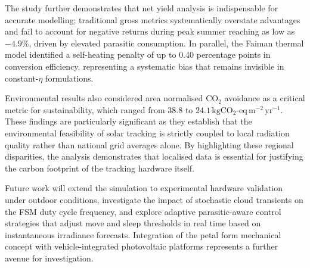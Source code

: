 \documentclass[preprint,3p,12pt]{elsarticle}
\begin{document}
The study further demonstrates that net yield analysis is
indispensable for accurate modelling; traditional gross metrics
systematically overstate advantages and fail to account for negative
returns during peak summer reaching as low as $-4.9\%$, driven by
elevated parasitic consumption. In parallel, the Faiman thermal model
identified a self-heating penalty of up to $0.40$ percentage points
in conversion efficiency, representing a systematic bias that remains
invisible in constant-$\eta$ formulations.

Environmental results also considered area normalised CO$_2$
avoidance as a critical metric for sustainability, which ranged from
$38.8$ to $24.1\,\mathrm{kgCO_2\text{-}eq\,m^{-2}\,yr^{-1}}$.
These findings are particularly significant as they establish that
the environmental feasibility of solar tracking is strictly coupled
to local radiation quality rather than national grid averages alone.
By highlighting these regional disparities, the analysis demonstrates
that localised data is essential for justifying the carbon footprint
of the tracking hardware itself.

Future work will extend the simulation to experimental hardware
validation under outdoor conditions, investigate the impact of
stochastic cloud transients on the FSM duty cycle frequency, and
explore adaptive parasitic-aware control strategies that adjust
move and sleep thresholds in real time based on instantaneous
irradiance forecasts. Integration of the petal form mechanical
concept with vehicle-integrated photovoltaic platforms represents
a further avenue for investigation.



\end{document}

